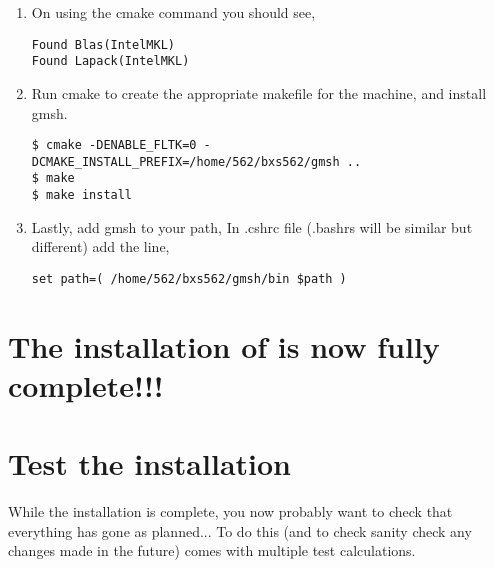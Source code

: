 \documentclass[11pt,a4paper,twoside]{report}
\begin{document}
\begin{enumerate}
\item On using the cmake command you should see,
\begin{lstlisting}
Found Blas(IntelMKL)
Found Lapack(IntelMKL)
\end{lstlisting}



\item Run cmake to create the appropriate makefile for the machine, and install gmsh.
\begin{lstlisting}
$ cmake -DENABLE_FLTK=0 -DCMAKE_INSTALL_PREFIX=/home/562/bxs562/gmsh ..
$ make
$ make install
\end{lstlisting}

\item Lastly, add gmsh to your path,
In .cshrc file (.bashrs will be similar but different) add the line,
\begin{lstlisting}
set path=( /home/562/bxs562/gmsh/bin $path ) 
\end{lstlisting}


\end{enumerate}






\section*{The installation of \CodeName is now fully complete!!!}



\section{Test the installation}

While the installation is complete, you now probably want to check that everything has gone as planned... To do this (and to check sanity check any changes made in the future) \CodeName comes with multiple test calculations.
\end{document}
